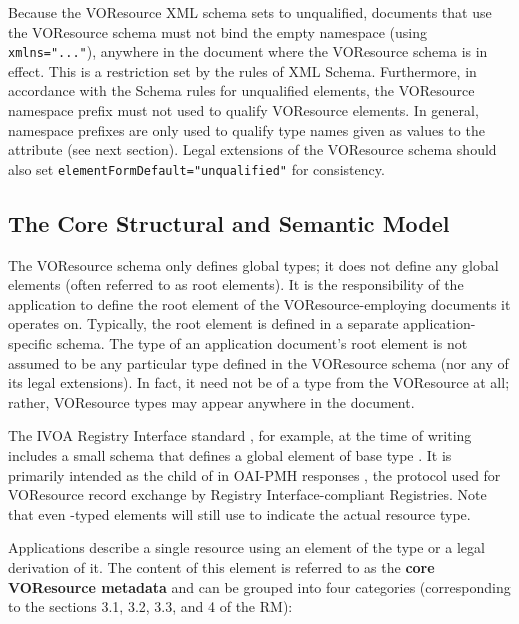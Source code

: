 \documentclass[11pt,a4paper]{ivoa}
\begin{document}
Because the VOResource XML schema sets  to
unqualified, documents that use the VOResource schema must not bind the
empty namespace (using \verb|xmlns="..."|), anywhere in the document
where the VOResource schema is in effect.  This is a restriction set by
the rules of XML Schema.  Furthermore, in accordance with the Schema
rules for unqualified elements, the VOResource namespace prefix must not
used to qualify VOResource elements.  In general, namespace prefixes are
only used to qualify type names given as values to the 
attribute (see next section).  Legal extensions of the VOResource schema
should also set \verb|elementFormDefault="unqualified"| for consistency.



\subsection{The Core Structural and Semantic Model}
\label{sect:core}

The VOResource schema only defines global types; it does not define
any global elements (often referred to as root elements).  It is the
responsibility of the application to define the root element of the
VOResource-employing documents it operates on.  Typically, the root
element is defined in a separate application-specific schema.  The
type of an application document's root element is not assumed to be
any particular type defined in the VOResource schema (nor any of its
legal extensions).  In fact, it need not be of a type from the
VOResource at all; rather, VOResource types may appear anywhere in the
document.   

The IVOA Registry Interface standard \citep{2009ivoa.spec.1104B}, 
for example, at the time of writing includes a small schema that defines
a global element  of base type
.  It is primarily intended as the child of
 in OAI-PMH responses \citep{std:oaipmh}, the protocol
used for VOResource record exchange by Registry Interface-compliant
Registries.  Note that even
-typed elements will still use  to
indicate the actual resource type.

Applications describe a single resource using an element of the type
 or a legal derivation of it.  The content of this
element is referred to as the \textbf{core VOResource
metadata} and can be grouped into four categories (corresponding to the
sections 3.1, 3.2, 3.3, and 4 of the RM):
\end{document}
